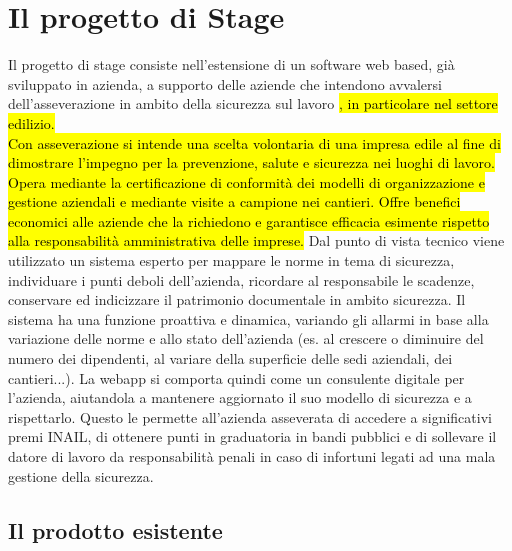 
\cleardoublepage
\section{Il progetto di Stage}
Il progetto di stage consiste nell'estensione di un software web based, già sviluppato in azienda, a supporto delle aziende che intendono avvalersi dell’asseverazione in ambito della sicurezza sul lavoro \hl{, in particolare nel settore edilizio. \\
Con asseverazione si intende una scelta volontaria di una impresa edile al fine di dimostrare l'impegno per la prevenzione, salute e sicurezza nei luoghi di lavoro. Opera mediante la certificazione di conformità dei modelli di organizzazione e gestione aziendali e mediante visite a campione nei cantieri. Offre benefici economici alle aziende che la richiedono e garantisce efficacia esimente rispetto alla responsabilità amministrativa delle imprese.}
Dal punto di vista tecnico viene utilizzato un sistema esperto per mappare le norme in tema di sicurezza, individuare i punti deboli dell’azienda, ricordare al responsabile le scadenze, conservare ed indicizzare il patrimonio documentale in ambito sicurezza.
Il sistema ha una funzione proattiva e dinamica, variando gli allarmi in base alla variazione delle norme e allo stato dell’azienda (es. al crescere o diminuire del numero dei dipendenti, al variare della superficie delle sedi aziendali, dei cantieri...). La webapp si comporta quindi come un consulente digitale per l’azienda, aiutandola a mantenere aggiornato il suo modello di sicurezza e a rispettarlo.
Questo le permette all’azienda asseverata di accedere a significativi premi INAIL, di ottenere punti in graduatoria in bandi pubblici e di sollevare il datore di lavoro da responsabilità penali in caso di infortuni legati ad una mala gestione della sicurezza.

\subsection{Il prodotto esistente}

